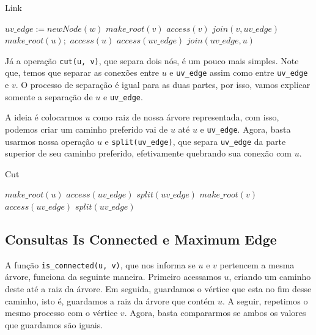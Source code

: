 \begin{algorithm}[h!]
    \caption{Link}\label{lct:link}
    \begin{algorithmic}
        \State $uv\_edge := new Node(w)$ 
        \State {}
        \State $make\_root(v)$
        \State $access(v)$
        \State $join(v, uv\_edge)$
        \State {}
        \State $make\_root(u);$
        \State $access(u)$
        \State $access(uv\_edge)$
        \State $join(uv\_edge, u)$
        \EndFunction
    \end{algorithmic}
\end{algorithm}

Já a operação \texttt{cut(u, v)}, que separa dois nós, é um pouco mais simples. Note que, temos que separar as conexões entre $u$ e \texttt{uv\_edge} assim como entre \texttt{uv\_edge} e $v$. O processo de separação é igual para as duas partes, por isso, vamos explicar somente a separação de $u$ e \texttt{uv\_edge}.

A ideia é colocarmos $u$ como raiz de nossa árvore representada, com isso, podemos criar um caminho preferido vai de $u$ até $u$ e \texttt{uv\_edge}. Agora, basta usarmos nossa operação $u$ e \texttt{split(uv\_edge)}, que separa \texttt{uv\_edge} da parte superior de seu caminho preferido, efetivamente quebrando sua conexão com $u$.

\begin{algorithm}[h!]
    \caption{Cut}\label{lct:cut}
    \begin{algorithmic}
        \State {}
        \State $make\_root(u)$
        \State $access(uv\_edge)$
        \State $split(uv\_edge)$
        \State {}
        \State $make\_root(v)$
        \State $access(uv\_edge)$
        \State $split(uv\_edge)$
        \EndFunction
    \end{algorithmic}
\end{algorithm}

\subsection{Consultas Is Connected e Maximum Edge}
\label{subsection:lct-is-connected}

A função \texttt{is\_connected(u, v)}, que nos informa se $u$ e $v$ pertencem a mesma árvore, funciona da seguinte maneira. Primeiro acessamos $u$, criando um caminho deste até a raiz da árvore. Em seguida, guardamos o vértice que esta no fim desse caminho, isto é, guardamos a raiz da árvore que contém $u$. A seguir, repetimos o mesmo processo com o vértice $v$. Agora, basta compararmos se ambos os valores que guardamos são iguais.

